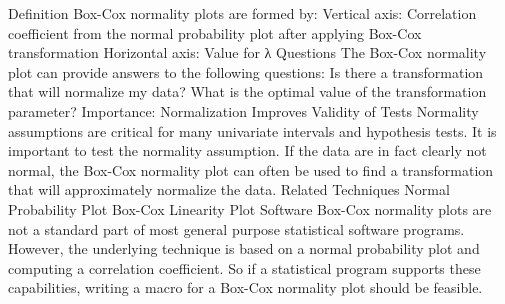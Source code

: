 Definition	Box-Cox normality plots are formed by:
Vertical axis: Correlation coefficient from the normal probability plot after applying Box-Cox transformation
Horizontal axis: Value for λ
Questions	The Box-Cox normality plot can provide answers to the following questions:
Is there a transformation that will normalize my data?
What is the optimal value of the transformation parameter?
Importance: 
Normalization Improves Validity of Tests	Normality assumptions are critical for many univariate intervals and hypothesis tests. It is important to test the normality assumption. If the data are in fact clearly not normal, the Box-Cox normality plot can often be used to find a transformation that will approximately normalize the data.
Related Techniques	Normal Probability Plot 
Box-Cox Linearity Plot
Software	Box-Cox normality plots are not a standard part of most general purpose statistical software programs. However, the underlying technique is based on a normal probability plot and computing a correlation coefficient. So if a statistical program supports these capabilities, writing a macro for a Box-Cox normality plot should be feasible.
